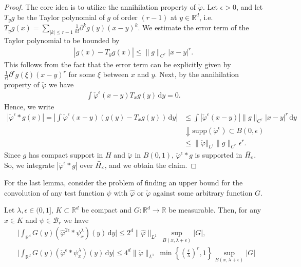 \begin{proof}
The core idea is to utilize the annihilation property of \(\check \varphi\). Let \(\epsilon > 0\), and let \(T_y g\) be the Taylor polynomial of \(g\) of order \((r-1)\) at \(y \in \mathbb{R}^d\), i.e. \(T_y g(x) = \sum\limits_{|k| \leq r - 1}\frac{1}{k!}\partial^k g(y)(x-y)^k\). We estimate the error term of the Taylor polynomial to be bounded by 
\begin{align*}
    |g(x) - T_y g(x)| \leq \lVert g \rVert_{C^r} |x-y|^r.
\end{align*}
This follows from the fact that the error term can be explicitly given by \(\frac{1}{r!}\partial^{r}g(\xi)(x - y)^r\) for some \(\xi\) between \(x\) and \(y\). Next, by the annihilation property of \(\check \varphi\) we have 
\begin{align*}
    \int\check \varphi^{\epsilon}(x - y)T_{x} g(y)  \, \mathrm{d}y = 0.
\end{align*}
Hence, we write 
\begin{align*}
        |\check \varphi^{\epsilon}* g(x)|  = \left|  \int\check \varphi^{\epsilon}(x - y) (g(y) - T_x g(y) )  \, \mathrm{d}y \right|
        &\leq \int |\check \varphi^{ \epsilon }(x-y)| \lVert g \rVert_{C^r} |x-y|^r \, \mathrm{d}y \\
        &\Downarrow \text{\(\mathrm{supp}(\check \varphi^{\epsilon}) \subset B(0,\epsilon)\)} \\
        &\leq \lVert \check \varphi \Vert_{L^1 } \lVert g \rVert_{C^r} \epsilon^r.
\end{align*}
Since \(g\) has compact support in \(H\) and \(\check \varphi\) in \(B(0,1)\), \(\check \varphi^{\epsilon}* g\) is supported in \(\bar{H}_{\epsilon}\). So, we integrate \(|\check \varphi^{\epsilon}* g|\) over \(\bar{H}_{\epsilon}\), and we obtain the claim.
\end{proof}

For the last lemma, consider the problem of finding an upper bound for the convolution of any test function \(\psi\) with \(\hat \varphi\) or \(\check \varphi\) against some arbitrary function \(G\).   

\begin{lemma}\label{lemma:WALFANGER}
    Let \(\lambda, \epsilon \in (0,1]\), \(K \subset \mathbb{R}^d\) be compact and \(G: \mathbb{R}^d \to \mathbb{R}\) be measurable. Then, for any \(x \in K\) and \(\psi \in \mathcal{B}_r\) we have 
    \begin{align} 
        &\Big| \int_{\mathbb{R}^d} G(y) \left( \hat \varphi^{2\epsilon} * \psi^\lambda_x \right) (y) \, \mathrm{d}y \Big| \leq 2^d \lVert \hat \varphi \rVert_{L^1} \, \sup_{B(x, \lambda + \epsilon)}|G|, \\
        &\Big| \int_{\mathbb{R}^d} G(y) \left( \check \varphi^{\epsilon} * \psi^\lambda_x \right) (y) \, \mathrm{d}y \Big| \leq 4^d \lVert \check \varphi \rVert_{L^1} \, \min\left\{ \left(\frac{\epsilon}{\lambda}\right)^r, 1 \right\}  \sup_{B(x, \lambda + \epsilon)}|G| \label{eq:WALFANGER}
    \end{align}  
\end{lemma}

